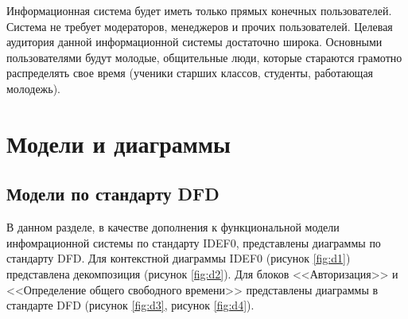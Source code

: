 \documentclass[14pt]{extreport}
\begin{document}
Информационная система будет иметь только прямых конечных пользователей. Система не требует модераторов, менеджеров и прочих пользователей.
Целевая аудитория данной информационной системы достаточно широка. Основными пользователями будут молодые, общительные люди, которые стараются грамотно распределять свое время (ученики старших классов, студенты, работающая молодежь).


\chapter{Модели и диаграммы}
    \section{Модели по стандарту DFD}
        В данном разделе, в качестве дополнения к функциональной модели инфомрационной системы по стандарту IDEF0, представлены диаграммы по стандарту DFD. Для контекстной диаграммы IDEF0 (рисунок \ref{fig:d1}) представлена декомпозиция (рисунок \ref{fig:d2}). Для блоков <<Авторизация>> и <<Определение общего свободного времени>> представлены диаграммы в стандарте DFD (рисунок \ref{fig:d3}, рисунок \ref{fig:d4}).
\end{document}

